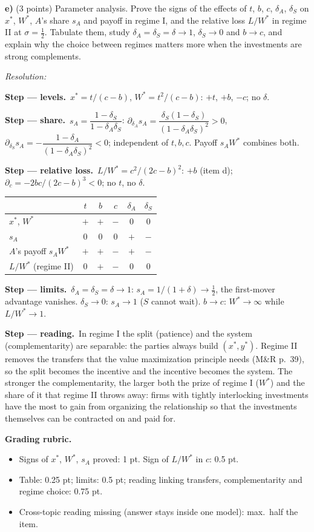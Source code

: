 \documentclass[11pt,a4paper]{article}
\newif\ifsolucoes
\newcommand{\espacoresol}{5cm}   %
\newcommand{\resolespaco}{\ifsolucoes\else\par\textit{Resolution:}\vspace{\espacoresol}\par\fi}
\newcommand{\passo}[2]{\par\smallskip\noindent\textbf{Step --- #1.}~#2}
\newcommand{\rubrica}[1]{\par\smallskip\noindent\textbf{Grading rubric.}\begin{itemize}[leftmargin=1.4em,topsep=1pt]#1\end{itemize}}
\begin{document}
\textbf{e)} (3 points) Parameter analysis. Prove the signs of the effects of $t$, $b$, $c$,
$\delta_A$, $\delta_S$ on $x^*$, $W^*$, $A$'s share $s_A$ and payoff in regime I, and the relative
loss $L/W^*$ in regime II at $\sigma=\tfrac12$. Tabulate them, study $\delta_A=\delta_S=\delta\to1$,
$\delta_S\to0$ and $b\to c$, and explain why the choice between regimes matters more when the
investments are strong complements.
\resolespaco
\begin{sol}
\passo{levels}{$x^*=t/(c-b)$, $W^*=t^2/(c-b)$: $+t$, $+b$, $-c$; no $\delta$.}
\passo{share}{$s_A=\dfrac{1-\delta_S}{1-\delta_A\delta_S}$:
$\partial_{\delta_A}s_A=\dfrac{\delta_S(1-\delta_S)}{(1-\delta_A\delta_S)^2}>0$,
$\partial_{\delta_S}s_A=-\dfrac{1-\delta_A}{(1-\delta_A\delta_S)^2}<0$; independent of $t,b,c$.
Payoff $s_AW^*$ combines both.}
\passo{relative loss}{$L/W^*=c^2/(2c-b)^2$: $+b$ (item d); $\partial_c=-2bc/(2c-b)^3<0$; no
$t$, no $\delta$.}
\begin{center}
\begin{tabular}{lccccc}\toprule
 & $t$ & $b$ & $c$ & $\delta_A$ & $\delta_S$\\\midrule
$x^*$, $W^*$ & $+$ & $+$ & $-$ & $0$ & $0$\\
$s_A$ & $0$ & $0$ & $0$ & $+$ & $-$\\
$A$'s payoff $s_AW^*$ & $+$ & $+$ & $-$ & $+$ & $-$\\
$L/W^*$ (regime II) & $0$ & $+$ & $-$ & $0$ & $0$\\\bottomrule
\end{tabular}
\end{center}
\passo{limits}{$\delta_A=\delta_S=\delta\to1$: $s_A=1/(1+\delta)\to\tfrac12$, the first-mover
advantage vanishes. $\delta_S\to0$: $s_A\to1$ ($S$ cannot wait). $b\to c$: $W^*\to\infty$ while
$L/W^*\to1$.}
\passo{reading}{In regime I the split (patience) and the system (complementarity) are separable:
the parties always build $(x^*,y^*)$. Regime II removes the transfers that the value
maximization principle needs (M\&R p.~39), so the split becomes the incentive and the incentive
becomes the system. The stronger the complementarity, the larger both the prize of regime I
($W^*$) and the share of it that regime II throws away: firms with tightly interlocking
investments have the most to gain from organizing the relationship so that the investments
themselves can be contracted on and paid for.}
\rubrica{
\item Signs of $x^*$, $W^*$, $s_A$ proved: 1 pt. Sign of $L/W^*$ in $c$: 0.5 pt.
\item Table: 0.25 pt; limits: 0.5 pt; reading linking transfers, complementarity and regime choice: 0.75 pt.
\item Cross-topic reading missing (answer stays inside one model): max.\ half the item.
}
\end{sol}
\end{document}
